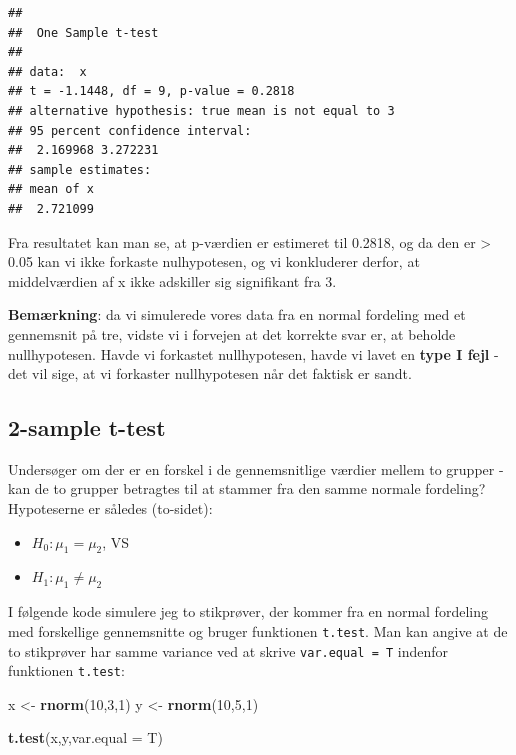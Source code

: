 \documentclass[
]{book}
\newenvironment{Shaded}{\begin{snugshade}}{\end{snugshade}}
\newcommand{\AttributeTok}[1]{\textcolor[rgb]{0.13,0.29,0.53}{#1}}
\newcommand{\DecValTok}[1]{\textcolor[rgb]{0.00,0.00,0.81}{#1}}
\newcommand{\FunctionTok}[1]{\textcolor[rgb]{0.13,0.29,0.53}{\textbf{#1}}}
\newcommand{\NormalTok}[1]{#1}
\newcommand{\OtherTok}[1]{\textcolor[rgb]{0.56,0.35,0.01}{#1}}
\providecommand{\tightlist}{%
  \setlength{\itemsep}{0pt}\setlength{\parskip}{0pt}}
\begin{document}
\begin{verbatim}
## 
##  One Sample t-test
## 
## data:  x
## t = -1.1448, df = 9, p-value = 0.2818
## alternative hypothesis: true mean is not equal to 3
## 95 percent confidence interval:
##  2.169968 3.272231
## sample estimates:
## mean of x 
##  2.721099
\end{verbatim}

Fra resultatet kan man se, at p-værdien er estimeret til 0.2818, og da den er \textgreater{} 0.05 kan vi ikke forkaste nulhypotesen, og vi konkluderer derfor, at middelværdien af x ikke adskiller sig signifikant fra 3.

\textbf{Bemærkning}: da vi simulerede vores data fra en normal fordeling med et gennemsnit på tre, vidste vi i forvejen at det korrekte svar er, at beholde nullhypotesen. Havde vi forkastet nullhypotesen, havde vi lavet en \textbf{type I fejl} - det vil sige, at vi forkaster nullhypotesen når det faktisk er sandt.

\subsection{2-sample t-test}\label{sample-t-test-1}

Undersøger om der er en forskel i de gennemsnitlige værdier mellem to grupper - kan de to grupper betragtes til at stammer fra den samme normale fordeling? Hypoteserne er således (to-sidet):

\begin{itemize}
\tightlist
\item
  \(H_{0}: \mu_{1} = \mu_{2}\), VS
\item
  \(H_{1}: \mu_{1} \neq \mu_{2}\)
\end{itemize}

I følgende kode simulere jeg to stikprøver, der kommer fra en normal fordeling med forskellige gennemsnitte og bruger funktionen \texttt{t.test}. Man kan angive at de to stikprøver har samme variance ved at skrive \texttt{var.equal\ =\ T} indenfor funktionen \texttt{t.test}:

\begin{Shaded}
\begin{Highlighting}[]
\NormalTok{x }\OtherTok{\textless{}{-}} \FunctionTok{rnorm}\NormalTok{(}\DecValTok{10}\NormalTok{,}\DecValTok{3}\NormalTok{,}\DecValTok{1}\NormalTok{)}
\NormalTok{y }\OtherTok{\textless{}{-}} \FunctionTok{rnorm}\NormalTok{(}\DecValTok{10}\NormalTok{,}\DecValTok{5}\NormalTok{,}\DecValTok{1}\NormalTok{)}

\FunctionTok{t.test}\NormalTok{(x,y,}\AttributeTok{var.equal =}\NormalTok{ T)}
\end{Highlighting}
\end{Shaded}
\end{document}
